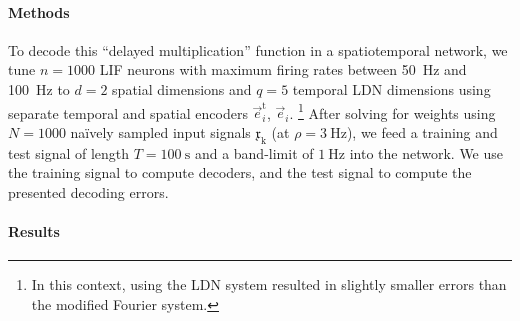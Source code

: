 \paragraph{Methods}
To decode this \enquote{delayed multiplication} function in a spatiotemporal network, we tune $n = 1000$ LIF neurons with maximum firing rates between \SI{50}{\hertz} and \SI{100}{\hertz} to $d = 2$ spatial dimensions and $q = 5$ temporal LDN dimensions using separate temporal and spatial encoders $\vec e_i^\mathrm{t}$, $\vec e_i$.%
\footnote{In this context, using the LDN system resulted in slightly smaller errors than the modified Fourier system.}
After solving for weights using $N = 1000$ na\"ively sampled input signals $\mathfrak{x}_\mathrm{k}$ (at $\rho = \SI{3}{\hertz}$), we feed a training and test signal of length $T = \SI{100}{\second}$ and a band-limit of $\SI{1}{\hertz}$ into the network.
We use the training signal to compute decoders, and the test signal to compute the presented decoding errors.

\paragraph{Results}


